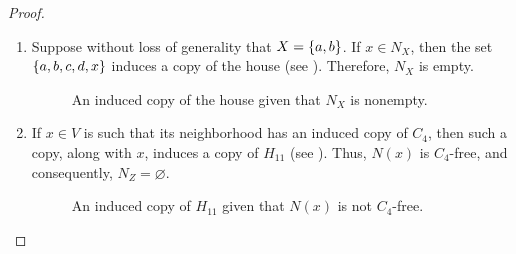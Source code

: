 \begin{proof}
    \leavevmode \par
    \begin{enumerate}[label=(\roman*)]
        \item Suppose without loss of generality that $X=\left\{a,b\right\}$. If $x\in N_X$,
            then the set $\left\{a,b,c,d,x\right\}$ induces a copy of the house (see
            ). Therefore, $N_X$ is empty.

            \begin{figure}[htb!]
                \centering
                \caption{An induced copy of the house given that $N_X$ is nonempty.}
                \label{fig:type_1}
            \end{figure}
        \item If $x\in V$ is such that its neighborhood has an induced copy of
            $C_4$, then such a copy, along with $x$, induces a copy of $H_{11}$
            (see ). Thus, $N(x)$ is $C_4$-free, and
            consequently, $N_Z=\varnothing$.

            \begin{figure}[htb!]
                \centering
                \caption{An induced copy of $H_{11}$ given that $N(x)$ is not
                    $C_4$-free.}
                \label{fig:type_2}
            \end{figure}
    \end{enumerate}
\end{proof}

